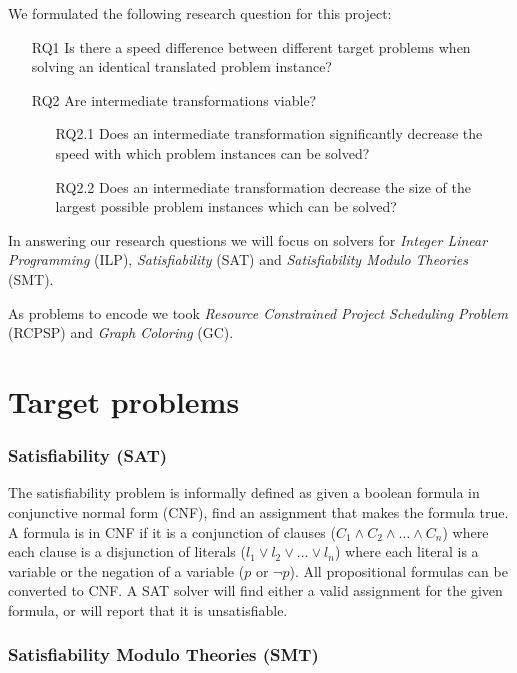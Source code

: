 \documentclass{sig-alternate}
\begin{document}
We formulated the following research question for this project:

\begin{enumerate}
\item[RQ1]{Is there a speed difference between different target problems when solving an identical translated problem instance?}
\item[RQ2]{Are intermediate transformations viable?}
	\begin{enumerate}
	\item[RQ2.1]{Does an intermediate transformation significantly decrease the speed with which problem instances can be solved?}
	\item[RQ2.2]{Does an intermediate transformation decrease the size of the largest possible problem instances which can be solved?}
	\end{enumerate}
\end{enumerate}

In answering our research questions we will focus on solvers for \emph{Integer Linear Programming} (ILP), \emph{Satisfiability} (SAT) and \emph{Satisfiability Modulo Theories} (SMT).

As problems to encode we took \emph{Resource Constrained Project Scheduling Problem} (RCPSP) and \emph{Graph Coloring} (GC).

\section {Target problems}

\subsubsection*{Satisfiability (SAT)}

The satisfiability problem is informally defined as given a boolean formula in conjunctive normal form (CNF), find an assignment that makes the formula true.
A formula is in CNF if it is a conjunction of clauses ($C_1 \wedge C_2 \wedge \ldots \wedge C_n$) where each clause is a disjunction of literals ($l_1 \lor l_2 \lor \ldots \lor l_n$) where each literal is a variable or the negation of a variable ($p$ or $\neg p$).
All propositional formulas can be converted to CNF.
A SAT solver will find either a valid assignment for the given formula, or will report that it is unsatisfiable.

\subsubsection*{Satisfiability Modulo Theories (SMT)}
\end{document}
